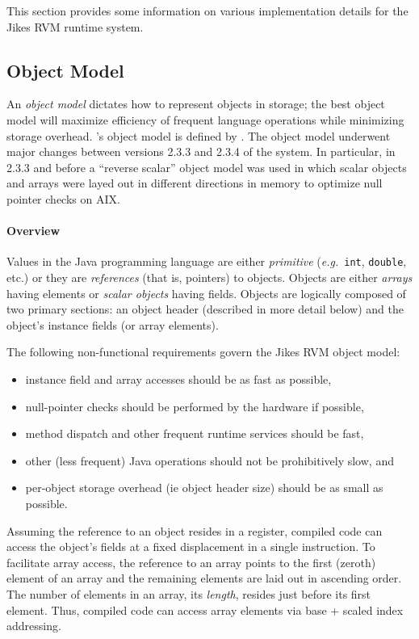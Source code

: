 This section provides some information on various
implementation details for the Jikes\TMweb{} RVM runtime system.

\subsection{Object Model}\label{sssec:objects}

An {\em object model} dictates how to represent objects in storage;
the best object model will maximize efficiency of frequent language
operations while minimizing storage overhead. \jrvm's
object model is defined by 
.
The \jrvm object model underwent major changes between versions 2.3.3
and 2.3.4 of the system.  In particular, in 2.3.3 and before a
``reverse scalar'' object model was used in which scalar objects and
arrays were layed out in different directions in memory to optimize
null pointer checks on AIX.

\paragraph{Overview}
Values in the Java\TMweb{} programming language are either {\em
primitive} ({\it e.g.}\ {\tt int}, {\tt double}, etc.)  or they are
{\em references} (that is, pointers) to objects.  Objects are either
{\em arrays} having elements or {\em scalar objects} having fields.
Objects are logically composed of two primary sections: an object
header (described in more detail below) and the object's instance
fields (or array elements).

The following non-functional requirements govern the Jikes RVM object model:
\begin{itemize}
\item
instance field and array accesses should be as fast as possible,
\item
null-pointer checks should be performed by the hardware if possible, 
\item
method dispatch and other frequent runtime services should be fast,
\item
other (less frequent) Java operations should not be prohibitively
slow, and
\item
per-object storage overhead (ie object header size) should be as small
as possible.
\end{itemize}

Assuming the reference to an object resides in a register, compiled
code can access the object's fields at a fixed displacement in a
single instruction.  To facilitate array access, the reference to an
array points to the first (zeroth) element of an array and the
remaining elements are laid out in ascending order.  The number of
elements in an array, its {\em length}, resides just before its first
element. Thus, compiled code can access array elements via base +
scaled index addressing.

